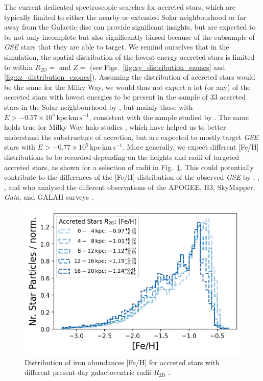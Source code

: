 \documentclass[fleqn,usenatbib]{mnras}
\begin{document}
The current dedicated spectroscopic searches for accreted stars, which are typically limited to either the nearby or extended Solar neighbourhood \citep[for example][]{Nissen2010, Buder2022} or far away from the Galactic disc \citep{Naidu2020} can provide significant insights, but are expected to be not only incomplete but also significantly biased because of the subsample of \textit{GSE} stars that they are able to target. We remind ourselves that in the simulation, the spatial distribution of the lowest-energy accreted stars is limited to within $R_\mathrm{2D} = $ and $Z = $ (see Figs.~\ref{fig:xy_distribution_ezones} and \ref{fig:xz_distribution_ezones}). Assuming the distribution of accreted stars would be the same for the Milky Way, we would thus not expect a lot (or any) of the accreted stars with lowest energies to be present in the sample of 33 accreted stars in the Solar neighbourhood by \citet{Nissen2010}, but mainly those with $E > -0.57\times10^5\,\mathrm{kpc\,km\,s^{-1}}$, consistent with the sample studied by \citet{Skuladottir2025}. The same holds true for Milky Way halo studies \citep{Naidu2020}, which have helped us to better understand the substructure of accretion, but are expected to mostly target \textit{GSE} stars with $E > -0.77\times10^{5}\,\mathrm{kpc\,km\,s^{-1}}$. More generally, we expect different [Fe/H] distributions to be recorded depending on the heights and radii of targeted accreted stars, as shown for a selection of radii in Fig.~\ref{fig:fe_h_histograms_r_bins}. This could potentially contribute to the differences of the [Fe/H] distribution of the observed \textit{GSE} by \citet{Das2020}, \citet{Naidu2020}, \citet{Feuillet2020, Feuillet2021}, and \cite{Buder2022} who analysed the different observations of the APOGEE, H3, SkyMapper, \textit{Gaia}, and GALAH surveys \citep[for a comparison of their reported {[Fe/H] distributions see Fig.~10 by}][]{Buder2022}.

\begin{figure}
    \centering
    \includegraphics[width=\columnwidth]{figures/fe_h_histograms_r_bins.png}
    \caption{Distribution of iron abundances {[Fe/H]} for accreted stars with different present-day galactocentric radii $R_\mathrm{2D}$ \href{https://github.com/svenbuder/gse_nihaouhd/tree/main/figures}{\faGithub}.}
    \label{fig:fe_h_histograms_r_bins}
\end{figure}
\end{document}
